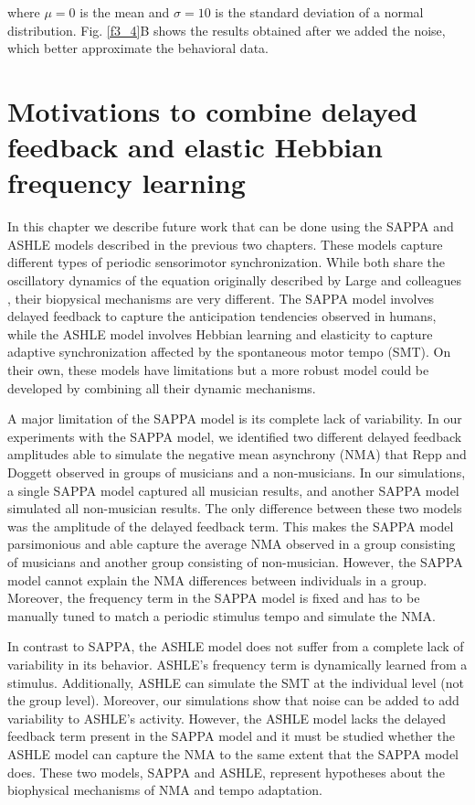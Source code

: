 \documentclass{report}
\begin{document}
where $\mu=0$ is the mean and $\sigma=10$ is the standard deviation of a normal distribution. Fig.{} \ref{f3_4}B shows the results obtained after we added the noise, which better approximate the behavioral data.

\chapter{Motivations to combine delayed feedback and elastic Hebbian frequency learning}

In this chapter we describe future work that can be done using the SAPPA and ASHLE models described in the previous two chapters. These models capture different types of periodic sensorimotor synchronization. While both share the oscillatory dynamics of the equation originally described by Large and colleagues \cite{large2010canonical}, their biopysical mechanisms are very different. The SAPPA model involves delayed feedback to capture the anticipation tendencies observed in humans, while the ASHLE model involves Hebbian learning and elasticity to capture adaptive synchronization affected by the spontaneous motor tempo (SMT). On their own, these models have limitations but a more robust model could be developed by combining all their dynamic mechanisms.

A major limitation of the SAPPA model is its complete lack of variability. In our experiments with the SAPPA model, we identified two different delayed feedback amplitudes able to simulate the negative mean asynchrony (NMA) that Repp and Doggett \cite{repp2007tapping} observed in groups of musicians and a non-musicians. In our simulations, a single SAPPA model captured all musician results, and another SAPPA model simulated all non-musician results. The only difference between these two models was the amplitude of the delayed feedback term. This makes the SAPPA model parsimonious and able capture the average NMA observed in a group consisting of musicians and another group consisting of non-musician. However, the SAPPA model cannot explain the NMA differences between individuals in a group. Moreover, the frequency term in the SAPPA model is fixed and has to be manually tuned to match a periodic stimulus tempo and simulate the NMA. 

In contrast to SAPPA, the ASHLE model does not suffer from a complete lack of variability in its behavior. ASHLE's frequency term is dynamically learned from a stimulus. Additionally, ASHLE can simulate the SMT at the individual level (not the group level). Moreover, our simulations show that noise can be added to add variability to ASHLE's activity. However, the ASHLE model lacks the delayed feedback term present in the SAPPA model and it must be studied whether the ASHLE model can capture the NMA to the same extent that the SAPPA model does. These two models, SAPPA and ASHLE, represent hypotheses about the biophysical mechanisms of NMA and tempo adaptation.
\end{document}
